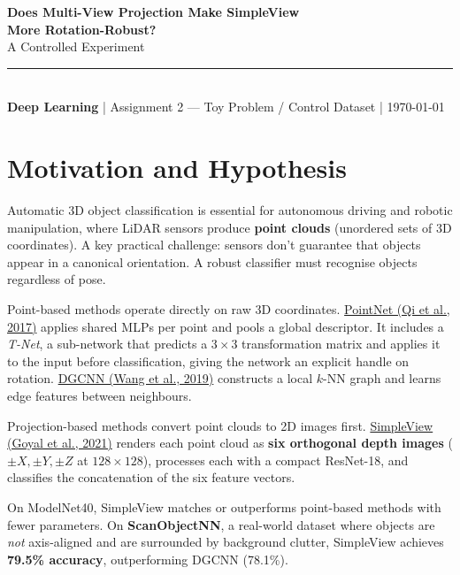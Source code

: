 \documentclass[12pt,a4paper]{article}
\begin{document}
\begin{center}
  {\fontsize{22}{28}\selectfont\bfseries
    Does Multi-View Projection Make SimpleView\\[4pt]
    More Rotation-Robust?}\\[12pt]
  {\large\color{bloggray} A Controlled Experiment}\\[8pt]
  \textcolor{blogborder}{\rule{0.5\linewidth}{1pt}}\\[8pt]
  {\color{bloggray}
    \textbf{Deep Learning} \quad|\quad
    Assignment 2 --- Toy Problem / Control Dataset \quad|\quad
    \today}
\end{center}

\vspace{1.5em}

\section{Motivation and Hypothesis}

Automatic 3D object classification is essential for autonomous driving and robotic manipulation, where LiDAR sensors produce \textbf{point clouds} (unordered sets of 3D coordinates). A key practical challenge: sensors don't guarantee that objects appear in a canonical orientation. A robust classifier must recognise objects regardless of pose.

Point-based methods operate directly on raw 3D coordinates.
\href{https://arxiv.org/abs/1612.00593}{PointNet (Qi et al., 2017)} applies shared MLPs per point and pools a global descriptor. It includes a \emph{T-Net}, a sub-network that predicts a $3\times3$ transformation matrix and applies it to the input before classification, giving the network an explicit handle on rotation.
\href{https://arxiv.org/abs/1801.07829}{DGCNN (Wang et al., 2019)} constructs a local $k$-NN graph and learns edge features between neighbours.

Projection-based methods convert point clouds to 2D images first.
\href{https://arxiv.org/abs/2106.05304}{SimpleView (Goyal et al., 2021)} renders each point cloud as \textbf{six orthogonal depth images} ($\pm X, \pm Y, \pm Z$ at $128\times128$), processes each with a compact ResNet-18, and classifies the concatenation of the six feature vectors.

On ModelNet40, SimpleView matches or outperforms point-based methods with fewer parameters. On \textbf{ScanObjectNN}, a real-world dataset where objects are \emph{not} axis-aligned and are surrounded by background clutter, SimpleView achieves \textbf{79.5\% accuracy}, outperforming DGCNN (78.1\%).
\end{document}
